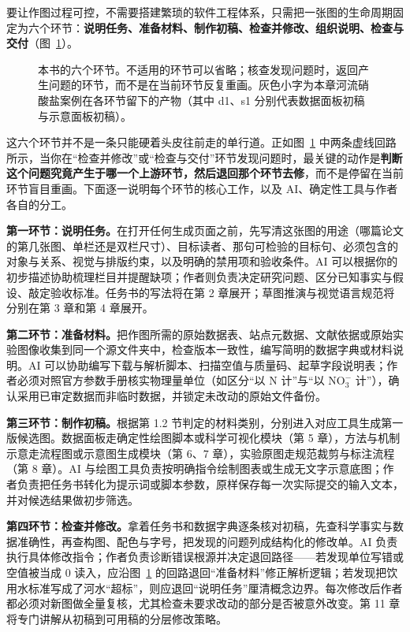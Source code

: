 要让作图过程可控，不需要搭建繁琐的软件工程体系，只需把一张图的生命周期固定为六个环节：\textbf{说明任务、准备材料、制作初稿、检查并修改、组织说明、检查与交付}（图~\ref{fig:ch01-01}）。

\begin{figure}[htbp]\centering
\resizebox{\linewidth}{!}{}
\caption{本书的六个环节。不适用的环节可以省略；核查发现问题时，返回产生问题的环节，而不是在当前环节反复重画。灰色小字为本章河流硝酸盐案例在各环节留下的产物（其中 d1、s1 分别代表数据面板初稿与示意面板初稿）。}\label{fig:ch01-01}
\end{figure}

这六个环节并不是一条只能硬着头皮往前走的单行道。正如图~\ref{fig:ch01-01} 中两条虚线回路所示，当你在“检查并修改”或“检查与交付”环节发现问题时，最关键的动作是\textbf{判断这个问题究竟产生于哪一个上游环节，然后退回那个环节去修}，而不是停留在当前环节盲目重画。下面逐一说明每个环节的核心工作，以及 AI、确定性工具与作者各自的分工。

\textbf{第一环节：说明任务。}在打开任何生成页面之前，先写清这张图的用途（哪篇论文的第几张图、单栏还是双栏尺寸）、目标读者、那句可检验的目标句、必须包含的对象与关系、视觉与排版约束，以及明确的禁用项和验收条件。AI 可以根据你的初步描述协助梳理栏目并提醒缺项；作者则负责决定研究问题、区分已知事实与假设、敲定验收标准。任务书的写法将在第 2 章展开；草图推演与视觉语言规范将分别在第 3 章和第 4 章展开。

\textbf{第二环节：准备材料。}把作图所需的原始数据表、站点元数据、文献依据或原始实验图像收集到同一个源文件夹中，检查版本一致性，编写简明的数据字典或材料说明。AI 可以协助编写下载与解析脚本、扫描空值与质量码、起草字段说明表；作者必须对照官方参数手册核实物理量单位（如区分“以 N 计”与“以 $\text{NO}_3^-$ 计”），确认采用已审定数据而非临时数据，并锁定未改动的原始文件备份。

\textbf{第三环节：制作初稿。}根据第 1.2 节判定的材料类别，分别进入对应工具生成第一版候选图。数据面板走确定性绘图脚本或科学可视化模块（第 5 章），方法与机制示意走流程图或示意图生成模块（第 6、7 章），实验原图走规范裁剪与标注流程（第 8 章）。AI 与绘图工具负责按明确指令绘制图表或生成无文字示意底图；作者负责把任务书转化为提示词或脚本参数，原样保存每一次实际提交的输入文本，并对候选结果做初步筛选。

\textbf{第四环节：检查并修改。}拿着任务书和数据字典逐条核对初稿，先查科学事实与数据准确性，再查构图、配色与字号，把发现的问题列成结构化的修改单。AI 负责执行具体修改指令；作者负责诊断错误根源并决定退回路径——若发现单位写错或空值被当成 0 读入，应沿图~\ref{fig:ch01-01} 的回路退回“准备材料”修正解析逻辑；若发现把饮用水标准写成了河水“超标”，则应退回“说明任务”厘清概念边界。每次修改后作者都必须对新图做全量复核，尤其检查未要求改动的部分是否被意外改变。第 11 章将专门讲解从初稿到可用稿的分层修改策略。

